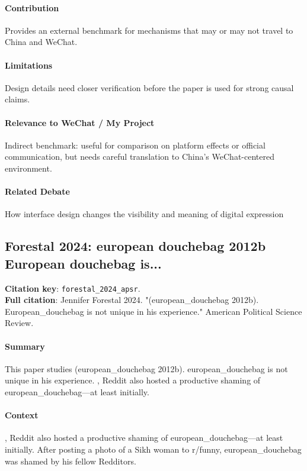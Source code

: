 \documentclass[12pt]{article}
\begin{document}
\paragraph{Contribution} Provides an external benchmark for mechanisms that may or may not travel to China and WeChat.

\paragraph{Limitations} Design details need closer verification before the paper is used for strong causal claims.

\paragraph{Relevance to WeChat / My Project} Indirect benchmark: useful for comparison on platform effects or official communication, but needs careful translation to China's WeChat-centered environment.

\paragraph{Related Debate} How interface design changes the visibility and meaning of digital expression


\subsection{Forestal 2024: european douchebag 2012b European douchebag is...}
\textbf{Citation key}: \texttt{forestal\_2024\_apsr}.\\
\textbf{Full citation}: Jennifer Forestal 2024. "(european\_douchebag 2012b). European\_douchebag is not unique in his experience." American Political Science Review.

\paragraph{Summary} This paper studies (european\_douchebag 2012b). european\_douchebag is not unique in his experience. , Reddit also hosted a productive shaming of european\_douchebag---at least initially.

\paragraph{Context} , Reddit also hosted a productive shaming of european\_douchebag---at least initially. After posting a photo of a Sikh woman to r/funny, european\_douchebag was shamed by his fellow Redditors.
\end{document}
